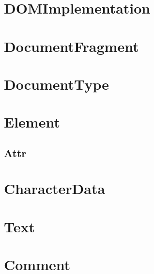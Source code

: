 \section{DOMImplementation}

\section{DocumentFragment}

\section{DocumentType}

\section{Element}

\subsection{Attr}

\section{CharacterData}

\section{Text}

\section{Comment}
